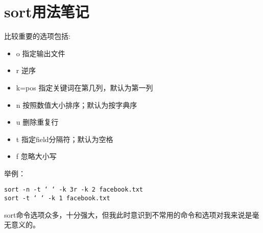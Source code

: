 \section{sort用法笔记}
比较重要的选项包括:

\begin{itemize}
    \item o 指定输出文件
    \item r 逆序
    \item k=pos 指定关键词在第几列，默认为第一列
    \item n 按照数值大小排序；默认为按字典序
    \item u 删除重复行
    \item t 指定field分隔符；默认为空格
    \item f 忽略大小写 
\end{itemize}


举例：
\begin{verbatim}
sort -n -t ‘ ‘ -k 3r -k 2 facebook.txt
sort -t ‘ ‘ -k 1 facebook.txt
\end{verbatim}

sort命令选项众多，十分强大，但我此时意识到不常用的命令和选项对我来说是毫无意义的。
